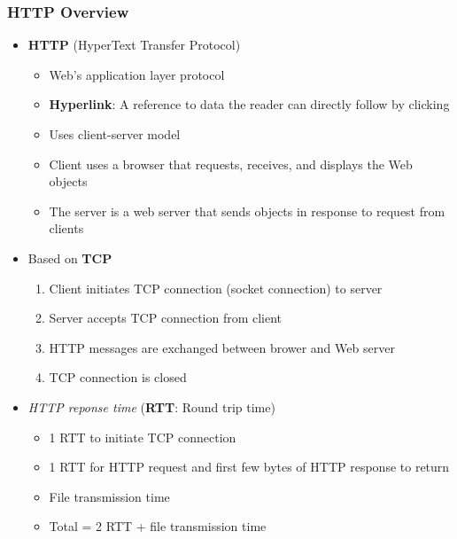 \subsubsection{HTTP Overview}
\begin{itemize}
	\item \textbf{HTTP} (HyperText Transfer Protocol)
	\begin{itemize}
		\item Web's application layer protocol
		\item \textbf{Hyperlink}: A reference to data the reader can directly follow by clicking
		\item Uses client-server model
		\item Client uses a browser that requests, receives, and displays the Web objects
		\item The server is a web server that sends objects in response to request from clients
	\end{itemize}
	\item Based on \textbf{TCP}
	\begin{enumerate}
		\item Client initiates TCP connection (socket connection) to server
		\item Server accepts TCP connection from client
		\item HTTP messages are exchanged between brower and Web server
		\item TCP connection is closed
	\end{enumerate}
	\item \textit{HTTP reponse time} (\textbf{RTT}: Round trip time)
	\begin{itemize}
		\item 1 RTT to initiate TCP connection
		\item 1 RTT for HTTP request and first few bytes of HTTP response to return
		\item File transmission time
		\item Total = 2 RTT + file transmission time
	\end{itemize}
\end{itemize}

